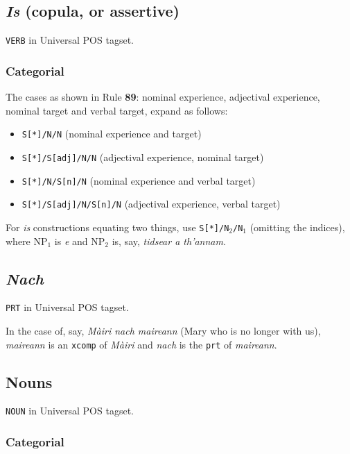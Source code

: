 \documentclass[a4paper]{article}
\begin{document}
\subsection{\textit{Is} (copula, or assertive)\label{subsect:is}}

\texttt{VERB} in Universal POS tagset.



\subsubsection*{Categorial}
The cases as shown in Rule \textbf{89}: nominal experience, adjectival experience, nominal target and verbal target, expand as follows:
\begin{itemize}
\item \texttt{S[*]/N/N} (nominal experience and target)
\item \texttt{S[*]/S[adj]/N/N} (adjectival experience, nominal target)
\item \texttt{S[*]/N/S[n]/N} (nominal experience and verbal target)
\item \texttt{S[*]/S[adj]/N/S[n]/N} (adjectival experience, verbal target)
\end{itemize}

 For \textit{is} constructions equating two things, use \texttt{S[*]/N$_2$/N$_1$} (omitting the indices), where NP$_1$ is \textit{e} and NP$_2$ is, say, \textit{tidsear a th'annam}. 

\subsection{\textit{Nach}\label{subsect:nach}}

\texttt{PRT} in Universal POS tagset.

 In the case of, say, \textit{M\`airi nach maireann} (Mary who is no longer with us), \textit{maireann} is an \texttt{xcomp} of \textit{M\`airi} and \textit{nach} is the \texttt{prt} of \textit{maireann}.


\subsection{Nouns\label{subsect:nouns}}

\texttt{NOUN} in Universal POS tagset.

\subsubsection*{Categorial}
\end{document}
